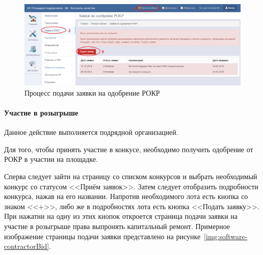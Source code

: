 \begin{figure}[h!]
	\begin{center}
		\begin{minipage}[h]{\linewidth}
			\centering
			\includegraphics[width=\linewidth]{images/software-contractorRequest.png}
			\caption{Процесс подачи заявки на одобрение РОКР}
			\label{img:software-contractorRequest}
		\end{minipage}
		\hfill
	\end{center}
\end{figure}

\paragraph{Участие в розыгрыше}

Данное действие выполняется подрядной организацией.

Для того, чтобы принять участие в конкусе, необходимо получить одобрение от РОКР в участии на площадке.

Сперва следует зайти на страницу со списком конкурсов и выбрать необходимый конкурс со статусом <<Приём заявок>>.
Затем следует отобразить подробности конкурса, нажав на его названии.
Напротив необходимого лота есть кнопка со знаком <<+>>, либо же в подробностях лота есть кнопка <<Подать заявку>>.
При нажатии на одну из этих кнопок откроется страница подачи заявки на участие в розыгрыше права выпронять капитальный ремонт.
Примерное изображение страницы подачи заявки представлено на рисунке~\ref{img:software-contractorBid}.

